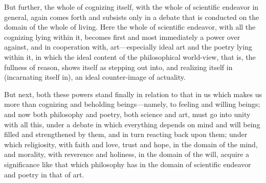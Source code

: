 \documentclass[12pt,a4paper]{book}
\begin{document}
But further, the whole of cognizing itself, with the whole of scientific endeavor in
general, again comes forth and subsists only in a debate that is conducted on the
domain of the whole of living. Here the whole of scientific endeavor, with all the
cognizing lying within it, becomes first and most immediately a power over against, and
in cooperation with, art---especially ideal art and the poetry lying within it, in
which the ideal content of the philosophical world-view, that is, the fullness of
reason, shows itself as stepping out into, and realizing itself in (incarnating itself
in), an ideal counter-image of actuality.

But next, both these powers stand finally in relation to that in us which makes us more
than cognizing and beholding beings---namely, to feeling and willing beings; and now
both philosophy and poetry, both science and art, must go into unity with all this,
under a debate in which everything depends on mind and will being filled and
strengthened by them, and in turn reacting back upon them; under which religiosity,
with faith and love, trust and hope, in the domain of the mind, and morality, with
reverence and holiness, in the domain of the will, acquire a significance like that
which philosophy has in the domain of scientific endeavor and poetry in that of art.
\end{document}
